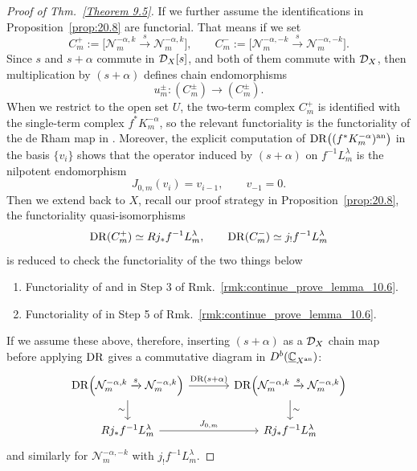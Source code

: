 \begin{proof}[Proof of Thm.~\ref{Theorem 9.5}]
    If we further assume the identifications in Proposition~\ref{prop:20.8} are functorial. That means if we set
    \[
        C_m^{+}:=\Big[\mathcal N_m^{-\alpha,k}\xrightarrow{s}\mathcal N_m^{-\alpha,k}\Big],\qquad
        C_m^{-}:=\Big[\mathcal N_m^{-\alpha,-k}\xrightarrow{s}\mathcal N_m^{-\alpha,-k}\Big].
    \]
    Since $s$ and $s+\alpha$ commute in $\mathcal{D}_X[s]$, and both of them commute with $\mathcal{D}_X$, then
    multiplication by $(s+\alpha)$ defines chain endomorphisms
    \[
        u_m^\pm:(C_m^\pm)\longrightarrow (C_m^\pm).
    \]
    When we restrict to the open set $U$, the two-term complex $C_m^+$ is identified with the single-term complex $f^*K_m^{-\alpha}$,
    so the relevant functoriality is the functoriality of the de Rham map in \cite[Prop.~4.7.6]{hotta2008d}.
    Moreover, the explicit computation of $\mathrm{DR}\bigl((f^*K_m^{-\alpha})^{\mathrm{an}}\bigr)$ in the basis $\{v_i\}$ shows that the operator induced by $(s+\alpha)$ on $f^{-1}L_m^\lambda$ is the nilpotent endomorphism
    \[
        J_{0,m}(v_i)=v_{i-1},\qquad v_{-1}=0.
    \]
    Then we extend back to $X$, recall our proof strategy in Proposition~\ref{prop:20.8}, the functoriality quasi-isomorphisms
    \[
        \mathrm{DR}(C_m^+) \simeq Rj_*f^{-1}L_m^\lambda,\qquad \mathrm{DR}(C_m^-) \simeq j_!f^{-1}L_m^\lambda
    \]
    is reduced to check the functoriality of the two things below
    \begin{enumerate}
        \item Functoriality of \cite[Thm.~1.2]{Wu2021CharacteristicCyclesHolonomicDmodules} and \cite[Thm.~4.1]{CalderonMorenoNarvaezMacarro2005Dualite} in Step 3 of Rmk.~\ref{rmk:continue_prove_lemma_10.6}.
        \item Functoriality of \cite[Theorem~2.10(2) and (3)]{Wu2020ComparisonNearbyCyclesBfunctions} in Step 5 of Rmk.~\ref{rmk:continue_prove_lemma_10.6}.
    \end{enumerate}
    If we assume these above, therefore, inserting $(s+\alpha)$ as a $\mathcal{D}_X$ chain map before applying $\mathrm{DR}$ gives a commutative diagram in $D^b(\underline{\mathbb{C}}_{X^{\mathrm{an}}})$:
    \[
        \begin{tikzcd}[column sep=large]
            \DR\!\left(\mathcal N_m^{-\alpha,k}\xrightarrow{s}\mathcal N_m^{-\alpha,k}\right) \arrow[r, "\DR(s+\alpha)"] \arrow[d, "\sim"'] & \DR\!\left(\mathcal N_m^{-\alpha,k}\xrightarrow{s}\mathcal N_m^{-\alpha,k}\right) \arrow[d, "\sim"] \\
            Rj_*f^{-1}L_m^\lambda \arrow[r, "J_{0,m}"]                                                                                      & Rj_*f^{-1}L_m^\lambda
        \end{tikzcd}
    \]
    and similarly for $\mathcal N_m^{-\alpha,-k}$ with $j_!f^{-1}L_m^\lambda$.


\end{proof}
